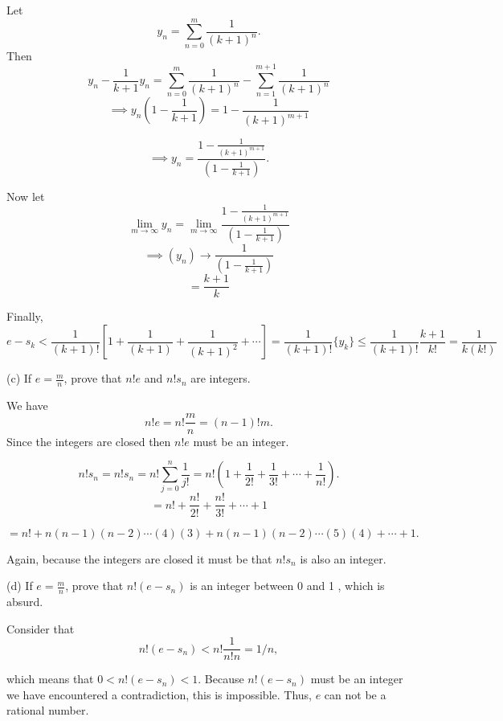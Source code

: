 \documentclass{report}
\begin{document}
\begin{myproof}
  Let $$ y_n = \sum_{n=0}^{m} \frac{1}{(k+1)^n} .$$ Then $$y_n - \frac{1}{k+1} y_n = \sum_{n=0}^{m} \frac{1}{(k+1)^n} - \sum_{n=1}^{m+1} \frac{1}{(k+1)^n} $$ 
  $$\implies y_n\left(1 - \frac{1}{k+1}\right) = 1 - \frac{1}{(k+1)^{m+1}} $$   

$$\implies y_n = \frac{1 - \frac{1}{(k+1)^{m+1}}}{\left(1 - \frac{1}{k+1}\right)}.$$


Now let $$ \lim_{m \rightarrow \infty} y_n = \lim_{m \rightarrow \infty}\frac{1 - \frac{1}{(k+1)^{m+1}}}{\left(1 - \frac{1}{k+1}\right)}$$
$$ \implies (y_n) \rightarrow \frac{1}{\left(1 - \frac{1}{k+1}\right)}$$
$$  = \frac{k+1}{k}$$

\pagebreak

Finally, $$ e - s_k  < \frac{1}{(k+1)!}\left[1 + \frac{1}{(k+1)}  + \frac{1}{(k+1)^2} + \cdots \right] = \frac{1}{(k+1)!}\{y_k\} \leq \frac{1}{(k+1)!} \frac{k+1}{k!} = \frac{1}{k(k!)}$$
\end{myproof}

\bigskip

(c) If $e=\frac{m}{n}$, prove that $n ! e$ and $n ! s_n$ are integers.

\begin{myproof}

We have $$ n!e = n!\frac{m}{n} = (n-1)!m.$$ Since the integers are closed then $n!e$ must be an integer. 
    
\end{myproof}

\begin{myproof}

$$ n!s_n = n!s_n= n!\sum_{j=0}^n \frac{1}{j!} = n!\left(1 + \frac{1}{2!} + \frac{1}{3!}+ \cdots +\frac{1}{n!}\right) .$$
$$ = n! + \frac{n!}{2!} + \frac{n!}{3!}+ \cdots + 1$$

$$ = n! + n(n-1)(n-2)\cdots(4)(3) + n(n-1)(n-2)\cdots(5)(4)+ \cdots + 1 .$$

Again, because the integers are closed  it must be that $n!s_n$ is also an integer.

\end{myproof}

\bigskip
(d) If $e=\frac{m}{n}$, prove that $n!\left(e-s_n\right)$ is an integer between 0 and 1 , which is absurd.

\bigskip
\begin{myproof}

Consider that $$n!\left(e-s_n\right) < n!\frac{1}{n!n}= 1/n,$$

which means that $0< n!\left(e-s_n\right) <1.$  Because  $n!(e-s_n)$ must be an integer we have encountered a contradiction, this is impossible. Thus, $e$ can not be a rational number.
    
\end{myproof}
\bigskip
\pagebreak
{}
\end{document}
